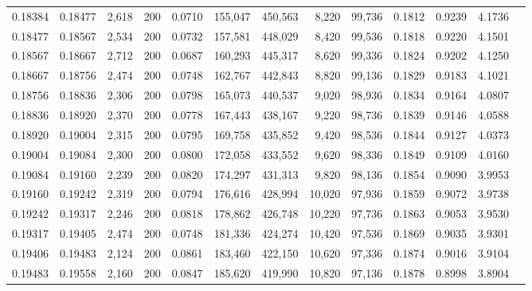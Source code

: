 \begin{tabular}{rrrrrrrrrrrrr}
0.18384 & 0.18477 & 2,618 & 200 &                                     0.0710 & 155,047 & 450,563 &   8,220 &  99,736 & 0.1812 & 0.9239 & 4.1736 \\
0.18477 & 0.18567 & 2,534 & 200 &                                     0.0732 & 157,581 & 448,029 &   8,420 &  99,536 & 0.1818 & 0.9220 & 4.1501 \\
0.18567 & 0.18667 & 2,712 & 200 &                                     0.0687 & 160,293 & 445,317 &   8,620 &  99,336 & 0.1824 & 0.9202 & 4.1250 \\
0.18667 & 0.18756 & 2,474 & 200 &                                     0.0748 & 162,767 & 442,843 &   8,820 &  99,136 & 0.1829 & 0.9183 & 4.1021 \\
0.18756 & 0.18836 & 2,306 & 200 &                                     0.0798 & 165,073 & 440,537 &   9,020 &  98,936 & 0.1834 & 0.9164 & 4.0807 \\
0.18836 & 0.18920 & 2,370 & 200 &                                     0.0778 & 167,443 & 438,167 &   9,220 &  98,736 & 0.1839 & 0.9146 & 4.0588 \\
0.18920 & 0.19004 & 2,315 & 200 &                                     0.0795 & 169,758 & 435,852 &   9,420 &  98,536 & 0.1844 & 0.9127 & 4.0373 \\
0.19004 & 0.19084 & 2,300 & 200 &                                     0.0800 & 172,058 & 433,552 &   9,620 &  98,336 & 0.1849 & 0.9109 & 4.0160 \\
0.19084 & 0.19160 & 2,239 & 200 &                                     0.0820 & 174,297 & 431,313 &   9,820 &  98,136 & 0.1854 & 0.9090 & 3.9953 \\
0.19160 & 0.19242 & 2,319 & 200 &                                     0.0794 & 176,616 & 428,994 &  10,020 &  97,936 & 0.1859 & 0.9072 & 3.9738 \\
0.19242 & 0.19317 & 2,246 & 200 &                                     0.0818 & 178,862 & 426,748 &  10,220 &  97,736 & 0.1863 & 0.9053 & 3.9530 \\
0.19317 & 0.19405 & 2,474 & 200 &                                     0.0748 & 181,336 & 424,274 &  10,420 &  97,536 & 0.1869 & 0.9035 & 3.9301 \\
0.19406 & 0.19483 & 2,124 & 200 &                                     0.0861 & 183,460 & 422,150 &  10,620 &  97,336 & 0.1874 & 0.9016 & 3.9104 \\
0.19483 & 0.19558 & 2,160 & 200 &                                     0.0847 & 185,620 & 419,990 &  10,820 &  97,136 & 0.1878 & 0.8998 & 3.8904 \\

\end{tabular}
